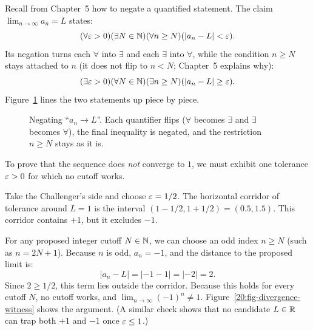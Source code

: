 Recall from Chapter~5 how to negate a quantified statement. The claim $\lim_{n \to \infty} a_n = L$ states:
\[
(\forall \varepsilon > 0)(\exists N \in \mathbb{N})(\forall n \ge N)(|a_n - L| < \varepsilon).
\]
Its negation turns each $\forall$ into $\exists$ and each $\exists$ into $\forall$, while the condition $n \ge N$ stays attached to $n$ (it does not flip to $n < N$; Chapter~5 explains why):
\[
(\exists \varepsilon > 0)(\forall N \in \mathbb{N})(\exists n \ge N)(|a_n - L| \ge \varepsilon).
\]
Figure~\ref{20:fig-negation-flip} lines the two statements up piece by piece.

\begin{figure}[htbp]
\centering
{}
\caption{Negating ``$a_n \to L$''. Each quantifier flips ($\forall$ becomes $\exists$ and $\exists$ becomes $\forall$), the final inequality is negated, and the restriction $n \ge N$ stays as it is.}\label{20:fig-negation-flip}
\end{figure}
To prove that the sequence does \emph{not} converge to $1$, we must exhibit one tolerance $\varepsilon > 0$ for which no cutoff works.

Take the Challenger's side and choose $\varepsilon = 1/2$. The horizontal corridor of tolerance around $L = 1$ is the interval $(1 - 1/2, 1 + 1/2) = (0.5, 1.5)$. This corridor contains $+1$, but it excludes $-1$.

For any proposed integer cutoff $N \in \mathbb{N}$, we can choose an odd index $n \ge N$ (such as $n = 2N + 1$). Because $n$ is odd, $a_n = -1$, and the distance to the proposed limit is:
\[
|a_n - L| = \lvert -1 - 1 \rvert = \lvert -2 \rvert = 2.
\]
Since $2 \ge 1/2$, this term lies outside the corridor. Because this holds for every cutoff $N$, no cutoff works, and $\lim_{n \to \infty} (-1)^n \neq 1$. Figure~\ref{20:fig-divergence-witness} shows the argument. (A similar check shows that no candidate $L \in \mathbb{R}$ can trap both $+1$ and $-1$ once $\varepsilon \le 1$.)

